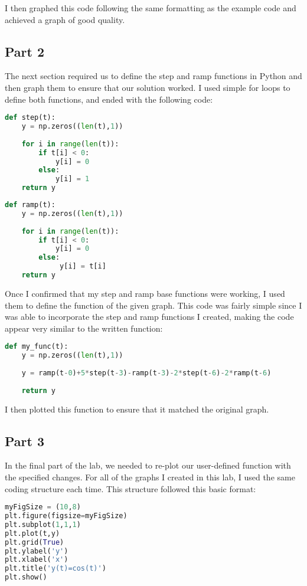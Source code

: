 \documentclass[12pt]{report}
\begin{document}
 I then graphed this code following the same formatting as the example code and achieved a graph of good quality.
 
 \subsection{Part 2}
 
 The next section required us to define the step and ramp functions in Python and then graph them to ensure that our solution worked. I used simple for loops to define both functions, and ended with the following code:
 \begin{lstlisting}[language=Python]
 def step(t):
    y = np.zeros((len(t),1))
    
    for i in range(len(t)):
        if t[i] < 0:
            y[i] = 0
        else:
            y[i] = 1
    return y
\end{lstlisting}
\newpage
\begin{lstlisting}[language=Python]
def ramp(t):
    y = np.zeros((len(t),1))
    
    for i in range(len(t)):
        if t[i] < 0:
            y[i] = 0
        else:
             y[i] = t[i]
    return y
\end{lstlisting}

Once I confirmed that my step and ramp base functions were working, I used them to define the function of the given graph. This code was fairly simple since I was able to incorporate the step and ramp functions I created, making the code appear very similar to the written function:
\begin{lstlisting}[language=Python]
def my_func(t):
    y = np.zeros((len(t),1))
    
    y = ramp(t-0)+5*step(t-3)-ramp(t-3)-2*step(t-6)-2*ramp(t-6)
    
    return y
\end{lstlisting}

I then plotted this function to ensure that it matched the original graph.
 
 \subsection{Part 3}
 
 In the final part of the lab, we needed to re-plot our user-defined function with the specified changes. For all of the graphs I created in this lab, I used the same coding structure each time. This structure followed this basic format:
 \begin{lstlisting}[language=Python]
myFigSize = (10,8)
plt.figure(figsize=myFigSize)
plt.subplot(1,1,1)
plt.plot(t,y) 
plt.grid(True)
plt.ylabel('y')
plt.xlabel('x')
plt.title('y(t)=cos(t)')
plt.show()
\end{lstlisting}
\end{document}
